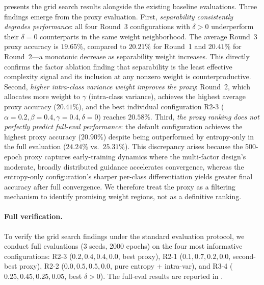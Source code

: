  presents the grid search results alongside the existing baseline evaluations. Three findings emerge from the proxy evaluation. First, \emph{separability consistently degrades performance}: all four Round~3 configurations with $\delta > 0$ underperform their $\delta = 0$ counterparts in the same weight neighborhood. The average Round~3 proxy accuracy is $19.65\%$, compared to $20.21\%$ for Round~1 and $20.41\%$ for Round~2---a monotonic decrease as separability weight increases. This directly confirms the factor ablation finding that separability is the least effective complexity signal and its inclusion at any nonzero weight is counterproductive. Second, \emph{higher intra-class variance weight improves the proxy}: Round~2, which allocates more weight to $\gamma$ (intra-class variance), achieves the highest average proxy accuracy ($20.41\%$), and the best individual configuration R2-3 ($\alpha{=}0.2, \beta{=}0.4, \gamma{=}0.4, \delta{=}0$) reaches $20.58\%$. Third, \emph{the proxy ranking does not perfectly predict full-eval performance}: the default \cags{} configuration achieves the highest proxy accuracy ($20.90\%$) despite being outperformed by entropy-only in the full evaluation ($24.24\%$ vs.\ $25.31\%$). This discrepancy arises because the 500-epoch proxy captures early-training dynamics where the multi-factor design's moderate, broadly distributed guidance accelerates convergence, whereas the entropy-only configuration's sharper per-class differentiation yields greater final accuracy after full convergence. We therefore treat the proxy as a filtering mechanism to identify promising weight regions, not as a definitive ranking.

\paragraph{Full verification.}
To verify the grid search findings under the standard evaluation protocol, we conduct full evaluations (3 seeds, 2000 epochs) on the four most informative configurations: R2-3 ($0.2, 0.4, 0.4, 0.0$, best proxy), R2-1 ($0.1, 0.7, 0.2, 0.0$, second-best proxy), R2-2 ($0.0, 0.5, 0.5, 0.0$, pure entropy + intra-var), and R3-4 ($0.25, 0.45, 0.25, 0.05$, best $\delta > 0$). The full-eval results are reported in .

